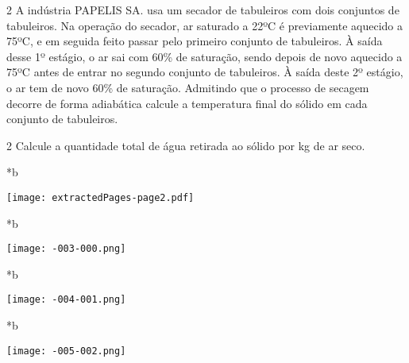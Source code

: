 \documentclass[\mainfilename]{subfiles}
\begin{document}
\begin{questionBox}2{ %
    A indústria PAPELIS SA. usa um secador de tabuleiros com dois conjuntos de tabuleiros. Na operação do secador, ar saturado a 22ºC é previamente aquecido a 75ºC, e em seguida feito passar pelo primeiro conjunto de tabuleiros. À saída desse 1º estágio, o ar sai com 60\% de saturação, sendo depois de novo aquecido a 75ºC antes de entrar no segundo conjunto de tabuleiros. À saída deste 2º estágio, o ar tem de novo 60\% de saturação. Admitindo que o processo de secagem decorre de forma adiabática calcule a temperatura final do sólido em cada conjunto de tabuleiros.
} %
\end{questionBox}

\begin{questionBox}2{ %
    Calcule a quantidade total de água retirada ao sólido por \unit{\kilo\gram} de ar seco.
} %
\end{questionBox}

\begin{sectionBox}*b{} %
    
    \begin{center}
        \texttt{[image: extractedPages-page2.pdf]}
    \end{center}
    
\end{sectionBox}
\begin{sectionBox}*b{} %
    
    \begin{center}
        \texttt{[image: -003-000.png]}
    \end{center}
    
\end{sectionBox}
\begin{sectionBox}*b{} %
    
    \begin{center}
        \texttt{[image: -004-001.png]}
    \end{center}
    
\end{sectionBox}
\begin{sectionBox}*b{} %
    
    \begin{center}
        \texttt{[image: -005-002.png]}
    \end{center}
    
\end{sectionBox}
\end{document}
